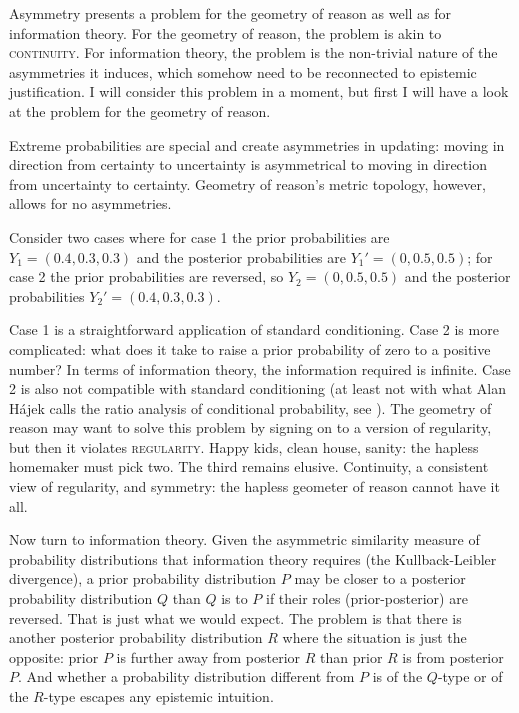 \documentclass[smallextended]{svjour3}       %
\begin{document}
Asymmetry presents a problem for the geometry of reason as well as for
information theory. For the geometry of reason, the problem is akin to
\textsc{continuity}. For information theory, the problem is the
non-trivial nature of the asymmetries it induces, which somehow need
to be reconnected to epistemic justification. I will consider this
problem in a moment, but first I will have a look at the problem for
the geometry of reason.

Extreme probabilities are special and create asymmetries in updating:
moving in direction from certainty to uncertainty is asymmetrical to
moving in direction from uncertainty to certainty. Geometry of
reason's metric topology, however, allows for no asymmetries.

\begin{quotex}
  \label{ex:extreme} Consider two cases
  where for case 1 the prior probabilities are $Y_{1}=(0.4,0.3,0.3)$
  and the posterior probabilities are $Y_{1}'=(0,0.5,0.5)$; for case 2
  the prior probabilities are reversed, so $Y_{2}=(0,0.5,0.5)$ and the
  posterior probabilities $Y_{2}'=(0.4,0.3,0.3)$.
\end{quotex}

Case 1 is a straightforward application of standard conditioning. Case
2 is more complicated: what does it take to raise a prior probability
of zero to a positive number? In terms of information theory, the
information required is infinite. Case 2 is also not compatible with
standard conditioning (at least not with what Alan H{\'a}jek calls the
ratio analysis of conditional probability, see ).
The geometry of reason may want to solve this problem by signing on to
a version of regularity, but then it violates \textsc{regularity}.
Happy kids, clean house, sanity: the hapless homemaker must pick two.
The third remains elusive. Continuity, a consistent view of
regularity, and symmetry: the hapless geometer of reason cannot have
it all.

Now turn to information theory. Given the asymmetric similarity
measure of probability distributions that information theory requires
(the Kullback-Leibler divergence), a prior probability distribution
$P$ may be closer to a posterior probability distribution $Q$ than $Q$
is to $P$ if their roles (prior-posterior) are reversed. That is just
what we would expect. The problem is that there is another posterior
probability distribution $R$ where the situation is just the opposite:
prior $P$ is further away from posterior $R$ than prior $R$ is from
posterior $P$. And whether a probability distribution different from
$P$ is of the $Q$-type or of the $R$-type escapes any epistemic
intuition.
\end{document}
